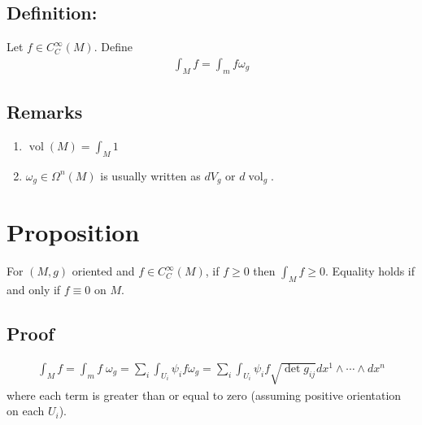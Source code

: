 \documentclass[11pt]{article}
\begin{document}
\subsection*{Definition:}
\label{sec:orgc738714}
Let \(f\in C_{C}^{\infty}(M)\). Define\\
\begin{align*}
  \int_{M}f=\int_{m}f\omega_{g}
\end{align*}
\subsection*{Remarks}
\label{sec:orgaa92978}
\begin{enumerate}
\item \(\operatorname{vol}(M)=\int_{M}1\)\\
\item \(\omega_{g}\in\Omega^{n}(M)\) is usually written as \(dV_{g}\) or \(d \operatorname{vol}_{g}\).\\
\end{enumerate}
\section*{Proposition}
\label{sec:orgf7ac29f}
For \((M,g)\) oriented and \(f\in C_{C}^{\infty}(M)\), if \(f\geq 0\) then \(\int_{M}f\geq 0\). Equality holds if and only if \(f\equiv 0\) on \(M\).\\
\subsection*{Proof}
\label{sec:orgb4a5aa1}
\begin{align*}
  \int_{M}f
  =\int_{m}f\;\omega_{g}
  =\sum_{i}\int_{U_{i}}\psi_{i}f\omega_{g}
  =\sum_{i}\int_{U_{i}}\psi_{i}f\sqrt{\det g_{ij}}dx^{1}\wedge\cdots\wedge dx^{n}
\end{align*}
where each term is greater than or equal to zero (assuming positive orientation on each \(U_{i}\)).\\
\end{document}
